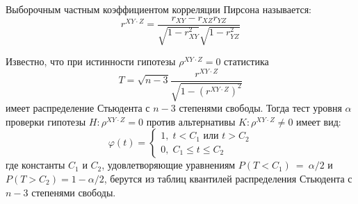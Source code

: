\begin{definition}
    Выборочным частным коэффициентом корреляции Пирсона называется:
    $$r^{XY\cdot Z}=\dfrac{r_{XY}-r_{XZ}r_{YZ}}{\sqrt{1-r_{XY}^2}\sqrt{1-r_{YZ}^2}}$$
\end{definition}

Известно, что при истинности гипотезы $\rho^{XY \cdot Z}=0$ статистика
$$
T=\sqrt{n-3} \dfrac{r^{XY \cdot Z}}{\sqrt{1-(r^{XY \cdot Z})^2}}
$$
имеет распределение Стьюдента с $n-3$ степенями свободы.
Тогда тест уровня $\alpha$ проверки гипотезы $H: \rho^{XY\cdot Z}=0$ против альтернативы $K: \rho^{XY\cdot Z} \neq 0$ имеет вид:
$$
\varphi(t) = \begin{cases}
    1, \; t<C_1 \text{ или } t>C_2 \\ 
    0, \; C_1 \leq t \leq C_2
\end{cases}
$$
где константы $C_1$ и $C_2$, удовлетворяющие уравнениям $P(T<C_1)~=~\alpha/2$ и $P(T>C_2)=1-\alpha/2$,
берутся из таблиц квантилей распределения Стьюдента с $n-3$ степенями свободы.
